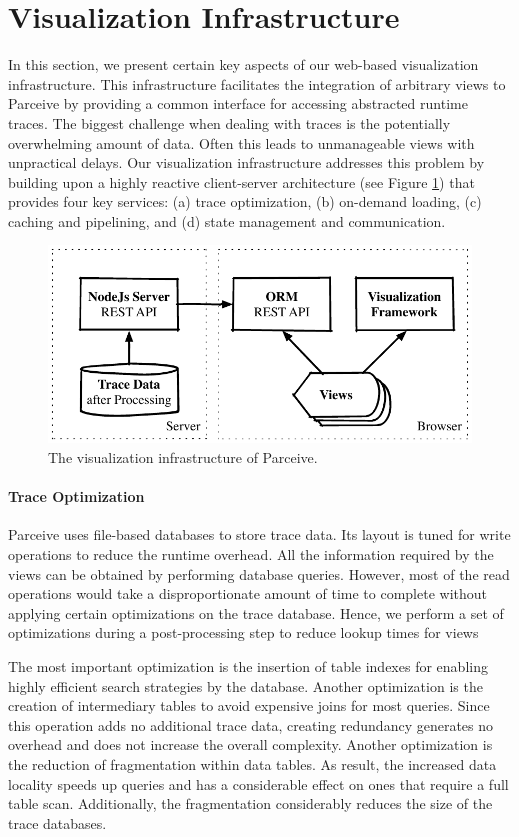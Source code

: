 \section{Visualization Infrastructure}
In this section, we present certain key aspects of our web-based visualization
infrastructure. This infrastructure facilitates the integration of arbitrary
views to Parceive by providing a common interface for accessing abstracted
runtime traces. The biggest challenge when dealing with traces is the
potentially overwhelming amount of data. Often this leads to unmanageable views
with unpractical delays. Our visualization infrastructure addresses this
problem by building upon a highly reactive client-server architecture (see
Figure \ref{fig:visualization}) that provides four key services: (a) trace
optimization, (b) on-demand loading, (c) caching and pipelining, and (d)
state management and communication.

\begin{figure}[h!]
\includegraphics[width=\linewidth]{img/visualization_framework}
\caption{The visualization infrastructure of Parceive.}
\label{fig:visualization}
\end{figure}

\paragraph{Trace Optimization}
Parceive uses file-based databases to store trace data. Its layout is tuned for
write operations to reduce the runtime overhead. All the information required
by the views can be obtained by performing database queries. However, most of
the read operations would take a disproportionate amount of time to complete
without applying certain optimizations on the trace database. Hence, we perform
a set of optimizations during a post-processing step to reduce lookup times for
views

The most important optimization is the insertion of table indexes for enabling
highly efficient search strategies by the database. Another optimization is the
creation of intermediary tables to avoid expensive joins for most queries.
Since this operation adds no additional trace data, creating redundancy
generates no overhead and does not increase the overall complexity. Another
optimization is the reduction of fragmentation within data tables. As
result, the increased data locality speeds up queries and has a considerable
effect on ones that require a full table scan. Additionally, the fragmentation
considerably reduces the size of the trace databases.

